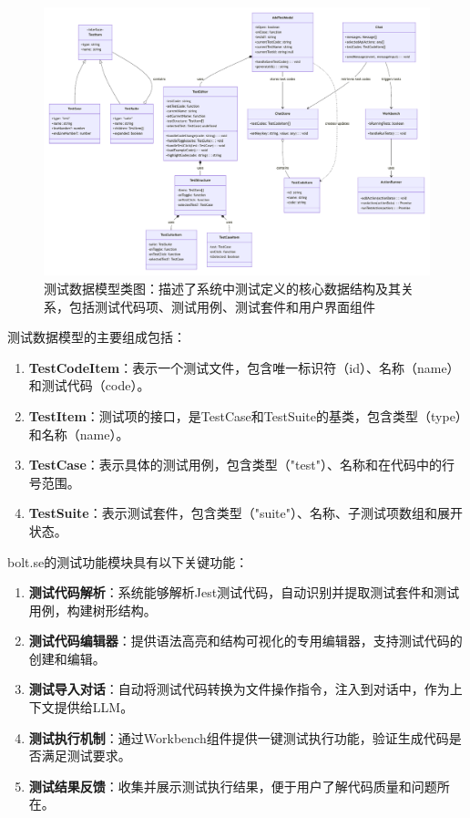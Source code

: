 \begin{figure}[htbp]
  \centering
  \includegraphics[width=\textwidth]{figures/bolt_test_class.pdf}
  \caption{测试数据模型类图：描述了系统中测试定义的核心数据结构及其关系，包括测试代码项、测试用例、测试套件和用户界面组件}
  \label{fig:test_class}
\end{figure}

测试数据模型的主要组成包括：

\begin{enumerate}
  \item \textbf{TestCodeItem}：表示一个测试文件，包含唯一标识符（id）、名称（name）和测试代码（code）。
  
  \item \textbf{TestItem}：测试项的接口，是TestCase和TestSuite的基类，包含类型（type）和名称（name）。
  
  \item \textbf{TestCase}：表示具体的测试用例，包含类型（"test"）、名称和在代码中的行号范围。
  
  \item \textbf{TestSuite}：表示测试套件，包含类型（"suite"）、名称、子测试项数组和展开状态。
\end{enumerate}

bolt.se的测试功能模块具有以下关键功能：

\begin{enumerate}
  \item \textbf{测试代码解析}：系统能够解析Jest测试代码，自动识别并提取测试套件和测试用例，构建树形结构。
  
  \item \textbf{测试代码编辑器}：提供语法高亮和结构可视化的专用编辑器，支持测试代码的创建和编辑。
  
  \item \textbf{测试导入对话}：自动将测试代码转换为文件操作指令，注入到对话中，作为上下文提供给LLM。
  
  \item \textbf{测试执行机制}：通过Workbench组件提供一键测试执行功能，验证生成代码是否满足测试要求。
  
  \item \textbf{测试结果反馈}：收集并展示测试执行结果，便于用户了解代码质量和问题所在。
\end{enumerate}


